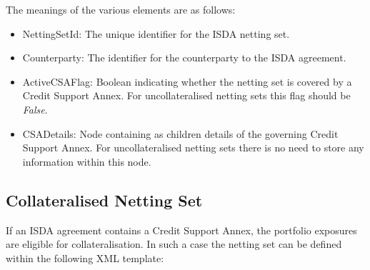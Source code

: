 The meanings of the various elements are as follows:
\begin{itemize}
\item NettingSetId: The unique identifier for the ISDA netting set.
\item Counterparty: The identifier for the counterparty to the ISDA agreement.
\item ActiveCSAFlag: Boolean indicating whether the netting set is
  covered by a Credit Support Annex. For uncollateralised netting sets
  this flag should be \emph{False}.
\item CSADetails: Node containing as children details of the governing
  Credit Support Annex. For uncollateralised netting sets there is no
  need to store any information within this node.
\end{itemize}
\subsection{Collateralised Netting Set}
If an ISDA agreement contains a Credit Support Annex, the
portfolio exposures are eligible for collateralisation. In such a
case the netting set can be defined within the following XML template:

